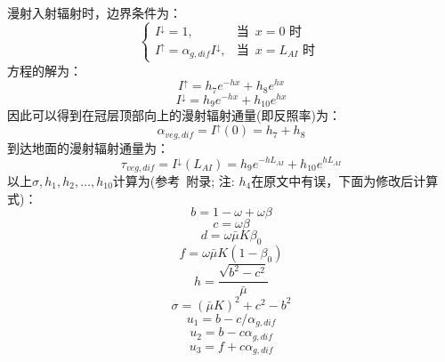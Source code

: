 漫射入射辐射时，边界条件为：
\begin{equation}
\begin{cases}
I^{\downarrow}=1, &\text {当 }\, x=0 \text { 时 } \\
I^{\uparrow}=\alpha_{g, dif} I^{\downarrow}, &\text {当 }\, x=L_{A I} \text { 时 }
\end{cases}
\end{equation}
方程的解为：
\begin{equation}\label{eq:2s_dif_up}
I^{\uparrow}=h_{7} e^{-h x}+h_{8} e^{h x}
\end{equation}
%
\begin{equation}\label{eq:2s_dif_dw}
I^{\downarrow}=h_{9} e^{-h x}+h_{10} e^{h x}
\end{equation}
因此可以得到在冠层顶部向上的漫射辐射通量(即反照率)为：
\begin{equation}
\alpha_{veg, dif}=I^{\uparrow}(0)=h_{7}+h_{8}
\end{equation}
到达地面的漫射辐射通量为：
\begin{equation}
\tau_{veg, dif}=I^{\downarrow}\left(L_{A I}\right)=h_{9} e^{-h L_{AI}}+h_{10} e^{h L_{AI}}
\end{equation}
以上$\sigma,h_1,h_2,\ldots,h_{10}$计算为(参考~\citet{sellers1985canopy}附录; 注: $h_4$在原文中有误，下面为修改后计算式)：
\begin{equation}
b=1-\omega+\omega \beta
\end{equation}
\begin{equation}
c=\omega \beta
\end{equation}
\begin{equation}
d=\omega \bar{\mu} K \beta_{0}
\end{equation}
\begin{equation}
f=\omega \bar{\mu} K\left(1-\beta_{0}\right)
\end{equation}
\begin{equation}
h=\frac{\sqrt{b^{2}-c^{2}}}{\bar{\mu}}
\end{equation}
\begin{equation}
\sigma=(\bar{\mu} K)^{2}+c^{2}-b^{2}
\end{equation}
\begin{equation}
u_{1}=b-c / \alpha_{g, dif}
\end{equation}
\begin{equation}
u_{2}=b-c \alpha_{g, dif}
\end{equation}
\begin{equation}
u_{3}=f+c \alpha_{g, dif}
\end{equation}
